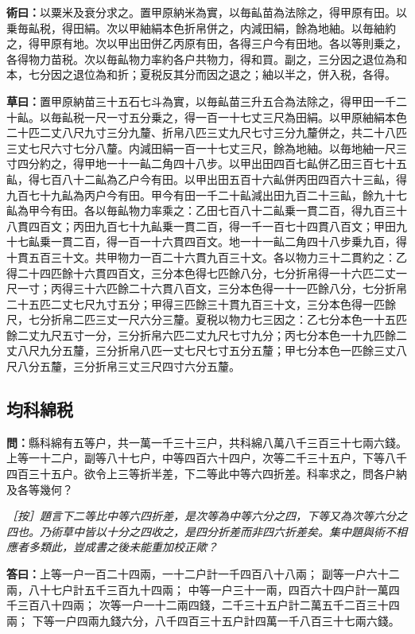 \documentclass[11pt,a4paper]{article}
\newcommand{\Question}[1]{\par\noindent\textbf{\color{problemcolor}問：}#1\par}
\newcommand{\Answer}[1]{\par\noindent\textbf{\color{answercolor}答曰：}#1\par}
\newcommand{\Method}[1]{\par\noindent\textbf{\color{methodcolor}術曰：}#1\par}
\newcommand{\Working}[1]{\par\noindent\textbf{草曰：}#1\par}
\newcommand{\EditorialNote}[1]{\par\noindent\textit{［按］#1}\par}
\begin{document}
\Method{以粟米及衰分求之。置甲原納米為實，以毎畆苗為法除之，得甲原有田。以乗毎畆税，得田絹。次以甲紬絹本色折帛併之，内減田絹，餘為地紬。以毎紬約之，得甲原有地。次以甲出田併乙丙原有田，各得三户今有田地。各以等則乗之，各得物力苗税。次以毎畆物力率約各户共物力，得和買。副之，三分因之退位為和本，七分因之退位為和折；夏税反其分而因之退之；紬以半之，併入税，各得。}

\Working{置甲原納苗三十五石七斗為實，以毎畆苗三升五合為法除之，得甲田一千二十畆。以毎畆税一尺一寸五分乗之，得一百一十七丈三尺為田絹。以甲原紬絹本色二十匹二丈八尺九寸三分九釐、折帛八匹三丈九尺七寸三分九釐併之，共二十八匹三丈七尺六寸七分八釐。内減田絹一百一十七丈三尺，餘為地紬。以毎地紬一尺三寸四分約之，得甲地一十一畆二角四十八步。以甲出田四百七畆併乙田三百七十五畆，得七百八十二畆為乙户今有田。以甲出田五百十六畆併丙田四百六十三畆，得九百七十九畆為丙户今有田。甲今有田一千二十畆減出田九百二十三畆，餘九十七畆為甲今有田。各以毎畆物力率乘之：乙田七百八十二畆乗一貫二百，得九百三十八貫四百文；丙田九百七十九畆乗一貫二百，得一千一百七十四貫八百文；甲田九十七畆乗一貫二百，得一百一十六貫四百文。地一十一畆二角四十八步乗九百，得十貫五百三十文。共甲物力一百二十六貫九百三十文。各以物力三十二貫約之：乙得二十四匹餘十六貫四百文，三分本色得七匹餘八分，七分折帛得一十六匹二丈一尺一寸；丙得三十六匹餘二十六貫八百文，三分本色得一十一匹餘八分，七分折帛二十五匹二丈七尺九寸五分；甲得三匹餘三十貫九百三十文，三分本色得一匹餘尺，七分折帛二匹三丈一尺六分三釐。夏税以物力七三因之：乙七分本色一十五匹餘二丈九尺五寸一分，三分折帛六匹二丈九尺七寸九分；丙七分本色一十九匹餘二丈八尺九分五釐，三分折帛八匹一丈七尺七寸五分五釐；甲七分本色一匹餘三丈八尺八分五釐，三分折帛三丈三尺四寸六分五釐。}

\subsection*{\color{sectioncolor}均科綿税}

\Question{縣科綿有五等户，共一萬一千三十三户，共科綿八萬八千三百三十七兩六錢。上等一十二户，副等八十七户，中等四百六十四户，次等二千三十五户，下等八千四百三十五户。欲令上三等折半差，下二等此中等六四折差。科率求之，問各户納及各等幾何？}

\EditorialNote{題言下二等比中等六四折差，是次等為中等六分之四，下等又為次等六分之四也。乃術草中皆以十分之四收之，是四分折差而非四六折差矣。集中題與術不相應者多類此，豈成書之後未能重加校正歟？}

\Answer{上等一户一百二十四兩，一十二户計一千四百八十八兩；
副等一户六十二兩，八十七户計五千三百九十四兩；
中等一户三十一兩，四百六十四户計一萬四千三百八十四兩；
次等一户一十二兩四錢，二千三十五户計二萬五千二百三十四兩；
下等一户四兩九錢六分，八千四百三十五户計四萬一千八百三十七兩六錢。}
\end{document}
